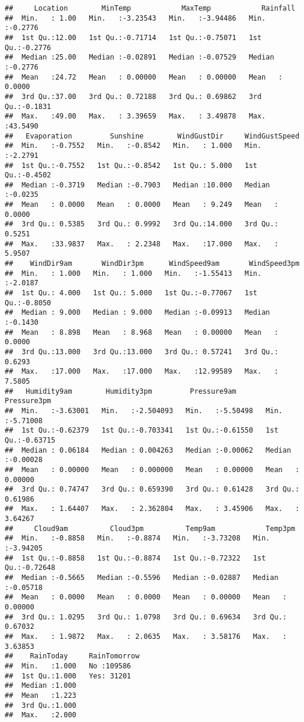 \documentclass[
]{article}
\begin{document}
\begin{verbatim}
##     Location        MinTemp            MaxTemp            Rainfall      
##  Min.   : 1.00   Min.   :-3.23543   Min.   :-3.94486   Min.   :-0.2776  
##  1st Qu.:12.00   1st Qu.:-0.71714   1st Qu.:-0.75071   1st Qu.:-0.2776  
##  Median :25.00   Median :-0.02891   Median :-0.07529   Median :-0.2776  
##  Mean   :24.72   Mean   : 0.00000   Mean   : 0.00000   Mean   : 0.0000  
##  3rd Qu.:37.00   3rd Qu.: 0.72188   3rd Qu.: 0.69862   3rd Qu.:-0.1831  
##  Max.   :49.00   Max.   : 3.39659   Max.   : 3.49878   Max.   :43.5490  
##   Evaporation         Sunshine        WindGustDir     WindGustSpeed    
##  Min.   :-0.7552   Min.   :-0.8542   Min.   : 1.000   Min.   :-2.2791  
##  1st Qu.:-0.7552   1st Qu.:-0.8542   1st Qu.: 5.000   1st Qu.:-0.4502  
##  Median :-0.3719   Median :-0.7903   Median :10.000   Median :-0.0235  
##  Mean   : 0.0000   Mean   : 0.0000   Mean   : 9.249   Mean   : 0.0000  
##  3rd Qu.: 0.5385   3rd Qu.: 0.9992   3rd Qu.:14.000   3rd Qu.: 0.5251  
##  Max.   :33.9837   Max.   : 2.2348   Max.   :17.000   Max.   : 5.9507  
##    WindDir9am       WindDir3pm      WindSpeed9am       WindSpeed3pm    
##  Min.   : 1.000   Min.   : 1.000   Min.   :-1.55413   Min.   :-2.0187  
##  1st Qu.: 4.000   1st Qu.: 5.000   1st Qu.:-0.77067   1st Qu.:-0.8050  
##  Median : 9.000   Median : 9.000   Median :-0.09913   Median :-0.1430  
##  Mean   : 8.898   Mean   : 8.968   Mean   : 0.00000   Mean   : 0.0000  
##  3rd Qu.:13.000   3rd Qu.:13.000   3rd Qu.: 0.57241   3rd Qu.: 0.6293  
##  Max.   :17.000   Max.   :17.000   Max.   :12.99589   Max.   : 7.5805  
##   Humidity9am        Humidity3pm         Pressure9am        Pressure3pm      
##  Min.   :-3.63001   Min.   :-2.504093   Min.   :-5.50498   Min.   :-5.71008  
##  1st Qu.:-0.62379   1st Qu.:-0.703341   1st Qu.:-0.61550   1st Qu.:-0.63715  
##  Median : 0.06184   Median : 0.004263   Median :-0.00062   Median :-0.00028  
##  Mean   : 0.00000   Mean   : 0.000000   Mean   : 0.00000   Mean   : 0.00000  
##  3rd Qu.: 0.74747   3rd Qu.: 0.659390   3rd Qu.: 0.61428   3rd Qu.: 0.61986  
##  Max.   : 1.64407   Max.   : 2.362804   Max.   : 3.45906   Max.   : 3.64267  
##     Cloud9am          Cloud3pm          Temp9am            Temp3pm        
##  Min.   :-0.8858   Min.   :-0.8874   Min.   :-3.73208   Min.   :-3.94205  
##  1st Qu.:-0.8858   1st Qu.:-0.8874   1st Qu.:-0.72322   1st Qu.:-0.72648  
##  Median :-0.5665   Median :-0.5596   Median :-0.02887   Median :-0.05718  
##  Mean   : 0.0000   Mean   : 0.0000   Mean   : 0.00000   Mean   : 0.00000  
##  3rd Qu.: 1.0295   3rd Qu.: 1.0798   3rd Qu.: 0.69634   3rd Qu.: 0.67032  
##  Max.   : 1.9872   Max.   : 2.0635   Max.   : 3.58176   Max.   : 3.63853  
##    RainToday     RainTomorrow
##  Min.   :1.000   No :109586  
##  1st Qu.:1.000   Yes: 31201  
##  Median :1.000               
##  Mean   :1.223               
##  3rd Qu.:1.000               
##  Max.   :2.000
\end{verbatim}
\end{document}
